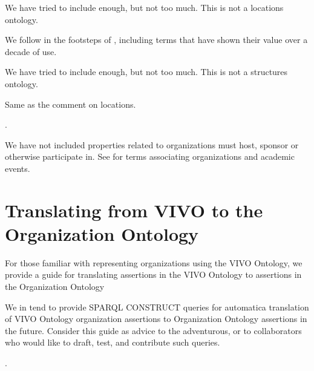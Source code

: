 \documentclass[letterpaper,10pt,english]{sphinxmanual}
\begin{document}
\begin{sphinxShadowBox}

\sphinxAtStartPar
We have tried to include enough, but not too much.  This is not a locations
ontology. %
\begin{footnote}[2]\sphinxAtStartFootnote
We follow in the footsteps of {\hyperref[\detokenize{glossary:glossary}]{}}, including terms that have
shown their value over a decade of use.
%
\end{footnote}
\end{sphinxShadowBox}

\begin{sphinxShadowBox}

\sphinxAtStartPar
We have tried to include enough, but not too much.  This is not a structures
ontology. %
\begin{footnote}[3]\sphinxAtStartFootnote
Same as the comment on locations.
%
\end{footnote}.
\end{sphinxShadowBox}

\begin{sphinxShadowBox}

\sphinxAtStartPar
We have not included properties related to organizations must host, sponsor or otherwise
participate in.  See  for terms associating
organizations and academic events.
\end{sphinxShadowBox}


\chapter{Translating from VIVO to the Organization Ontology}
\label{\detokenize{vivo-to-org:translating-from-vivo-to-the-organization-ontology}}\label{\detokenize{vivo-to-org::doc}}
\sphinxAtStartPar
For those familiar with representing organizations using the VIVO Ontology,
we provide a guide for translating assertions in the VIVO Ontology to assertions
in the Organization Ontology %
\begin{footnote}[1]\sphinxAtStartFootnote
We in tend to provide SPARQL CONSTRUCT queries for automatica translation of
VIVO Ontology organization assertions to Organization Ontology assertions
in the future.  Consider this guide as advice to the adventurous, or to collaborators
who would like to draft, test, and contribute such queries.
%
\end{footnote}.
\end{document}
